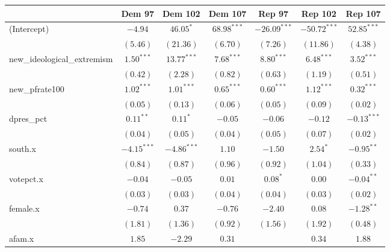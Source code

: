 \documentclass[12pt]{article}
\begin{document}
\begin{table}
	\begin{center}
		\begin{tabular}{l c c c c c c }
			\hline
			& Dem 97 & Dem 102 & Dem 107 & Rep 97 & Rep 102 & Rep 107 \\
			\hline
			(Intercept)                 & $-4.94$       & $46.05^{*}$   & $68.98^{***}$ & $-26.09^{***}$ & $-50.72^{***}$ & $52.85^{***}$ \\
			& $(5.46)$      & $(21.36)$     & $(6.70)$      & $(7.26)$       & $(11.86)$      & $(4.38)$      \\
			new\_ideological\_extremism & $1.50^{***}$  & $13.77^{***}$ & $7.68^{***}$  & $8.80^{***}$   & $6.48^{***}$   & $3.52^{***}$  \\
			& $(0.42)$      & $(2.28)$      & $(0.82)$      & $(0.63)$       & $(1.19)$       & $(0.51)$      \\
			new\_pfrate100              & $1.02^{***}$  & $1.01^{***}$  & $0.65^{***}$  & $0.60^{***}$   & $1.12^{***}$   & $0.32^{***}$  \\
			& $(0.05)$      & $(0.13)$      & $(0.06)$      & $(0.05)$       & $(0.09)$       & $(0.02)$      \\
			dpres\_pct                  & $0.11^{**}$   & $0.11^{*}$    & $-0.05$       & $-0.06$        & $-0.12$        & $-0.13^{***}$ \\
			& $(0.04)$      & $(0.05)$      & $(0.04)$      & $(0.05)$       & $(0.07)$       & $(0.02)$      \\
			south.x                     & $-4.15^{***}$ & $-4.86^{***}$ & $1.10$        & $-1.50$        & $2.54^{*}$     & $-0.95^{**}$  \\
			& $(0.84)$      & $(0.87)$      & $(0.96)$      & $(0.92)$       & $(1.04)$       & $(0.33)$      \\
			votepct.x                   & $-0.04$       & $-0.05$       & $0.01$        & $0.08^{*}$     & $0.00$         & $-0.04^{**}$  \\
			& $(0.03)$      & $(0.03)$      & $(0.04)$      & $(0.04)$       & $(0.03)$       & $(0.02)$      \\
			female.x                    & $-0.74$       & $0.37$        & $-0.76$       & $-2.40$        & $0.08$         & $-1.28^{**}$  \\
			& $(1.81)$      & $(1.36)$      & $(0.92)$      & $(1.56)$       & $(1.92)$       & $(0.48)$      \\
			afam.x                      & $1.85$        & $-2.29$       & $0.31$        &                & $0.34$         & $1.88$        \\

\end{tabular}
\end{center}
\end{table}
\end{document}

